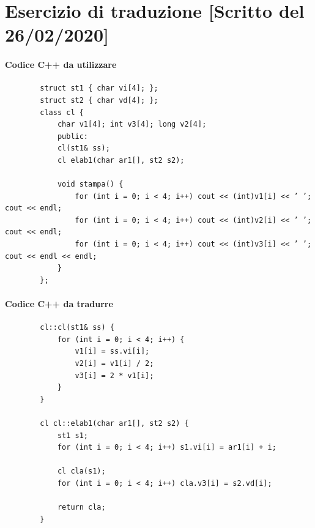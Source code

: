 \section{Esercizio di traduzione [Scritto del 26/02/2020]}
\begingroup
\small
\begin{framed}
	\paragraph{Codice C++ da utilizzare}
	\begin{verbatim}
		struct st1 { char vi[4]; };
		struct st2 { char vd[4]; };
		class cl {
			char v1[4]; int v3[4]; long v2[4];
			public:
			cl(st1& ss);
			cl elab1(char ar1[], st2 s2);   
			
			void stampa() {
				for (int i = 0; i < 4; i++) cout << (int)v1[i] << ’ ’; cout << endl;
				for (int i = 0; i < 4; i++) cout << (int)v2[i] << ’ ’; cout << endl;
				for (int i = 0; i < 4; i++) cout << (int)v3[i] << ’ ’; cout << endl << endl;
			}
		};
	\end{verbatim}
	\paragraph{Codice C++ da tradurre}
	\begin{verbatim}
		cl::cl(st1& ss) {
			for (int i = 0; i < 4; i++) {
				v1[i] = ss.vi[i]; 
				v2[i] = v1[i] / 2;
				v3[i] = 2 * v1[i];
			}
		}
		
		cl cl::elab1(char ar1[], st2 s2) {
			st1 s1;
			for (int i = 0; i < 4; i++) s1.vi[i] = ar1[i] + i;
			
			cl cla(s1);
			for (int i = 0; i < 4; i++) cla.v3[i] = s2.vd[i];
			
			return cla;
		}
	\end{verbatim}
\end{framed}
